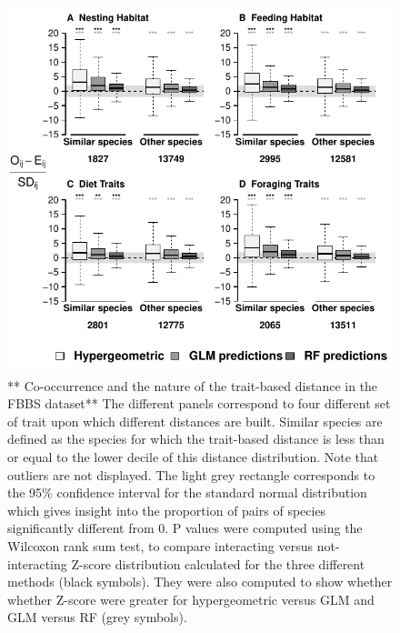 \newpage

\begin{figure}
\centering
\includegraphics{chapitre3/figS4.pdf}
\caption{** Co-occurrence and the nature of the trait-based distance in
the FBBS dataset** The different panels correspond to four different set
of trait upon which different distances are built. Similar species are
defined as the species for which the trait-based distance is less than
or equal to the lower decile of this distance distribution. Note that
outliers are not displayed. The light grey rectangle corresponds to the
95\% confidence interval for the standard normal distribution which
gives insight into the proportion of pairs of species significantly
different from 0. P values were computed using the Wilcoxon rank sum
test, to compare interacting versus not-interacting Z-score distribution
calculated for the three different methods (black symbols). They were
also computed to show whether whether Z-score were greater for
hypergeometric versus GLM and GLM versus RF (grey
symbols).\label{fig:dist}}
\end{figure}

\newpage

